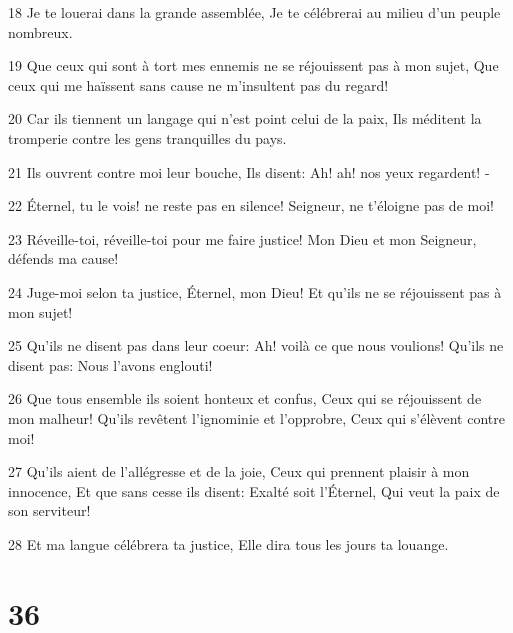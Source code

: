 \par 18 Je te louerai dans la grande assemblée, Je te célébrerai au milieu d'un peuple nombreux.
\par 19 Que ceux qui sont à tort mes ennemis ne se réjouissent pas à mon sujet, Que ceux qui me haïssent sans cause ne m'insultent pas du regard!
\par 20 Car ils tiennent un langage qui n'est point celui de la paix, Ils méditent la tromperie contre les gens tranquilles du pays.
\par 21 Ils ouvrent contre moi leur bouche, Ils disent: Ah! ah! nos yeux regardent! -
\par 22 Éternel, tu le vois! ne reste pas en silence! Seigneur, ne t'éloigne pas de moi!
\par 23 Réveille-toi, réveille-toi pour me faire justice! Mon Dieu et mon Seigneur, défends ma cause!
\par 24 Juge-moi selon ta justice, Éternel, mon Dieu! Et qu'ils ne se réjouissent pas à mon sujet!
\par 25 Qu'ils ne disent pas dans leur coeur: Ah! voilà ce que nous voulions! Qu'ils ne disent pas: Nous l'avons englouti!
\par 26 Que tous ensemble ils soient honteux et confus, Ceux qui se réjouissent de mon malheur! Qu'ils revêtent l'ignominie et l'opprobre, Ceux qui s'élèvent contre moi!
\par 27 Qu'ils aient de l'allégresse et de la joie, Ceux qui prennent plaisir à mon innocence, Et que sans cesse ils disent: Exalté soit l'Éternel, Qui veut la paix de son serviteur!
\par 28 Et ma langue célébrera ta justice, Elle dira tous les jours ta louange.

\chapter{36}

